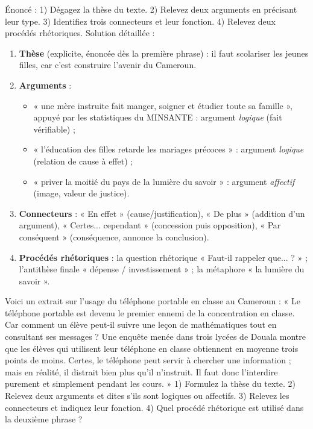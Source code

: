 \documentclass[11pt]{article}
\begin{document}
\begin{exoresolu}
Énoncé : 1) Dégagez la thèse du texte. 2) Relevez deux arguments en précisant leur type. 3) Identifiez trois connecteurs et leur fonction. 4) Relevez deux procédés rhétoriques.
\tcblower
Solution détaillée :
\begin{enumerate}
\item \textbf{Thèse} (explicite, énoncée dès la première phrase) : il faut scolariser les jeunes filles, car c'est construire l'avenir du Cameroun.
\item \textbf{Arguments} :
\begin{itemize}
\item « une mère instruite fait manger, soigner et étudier toute sa famille », appuyé par les statistiques du MINSANTE : argument \emph{logique} (fait vérifiable) ;
\item « l'éducation des filles retarde les mariages précoces » : argument \emph{logique} (relation de cause à effet) ;
\item « priver la moitié du pays de la lumière du savoir » : argument \emph{affectif} (image, valeur de justice).
\end{itemize}
\item \textbf{Connecteurs} : « En effet » (cause/justification), « De plus » (addition d'un argument), « Certes... cependant » (concession puis opposition), « Par conséquent » (conséquence, annonce la conclusion).
\item \textbf{Procédés rhétoriques} : la question rhétorique « Faut-il rappeler que... ? » ; l'antithèse finale « dépense / investissement » ; la métaphore « la lumière du savoir ».
\end{enumerate}
\end{exoresolu}

\begin{exercice}
Voici un extrait sur l'usage du téléphone portable en classe au Cameroun : « Le téléphone portable est devenu le premier ennemi de la concentration en classe. Car comment un élève peut-il suivre une leçon de mathématiques tout en consultant ses messages ? Une enquête menée dans trois lycées de Douala montre que les élèves qui utilisent leur téléphone en classe obtiennent en moyenne trois points de moins. Certes, le téléphone peut servir à chercher une information ; mais en réalité, il distrait bien plus qu'il n'instruit. Il faut donc l'interdire purement et simplement pendant les cours. »
1) Formulez la thèse du texte. 2) Relevez deux arguments et dites s'ils sont logiques ou affectifs. 3) Relevez les connecteurs et indiquez leur fonction. 4) Quel procédé rhétorique est utilisé dans la deuxième phrase ?
\end{exercice}
\end{document}
